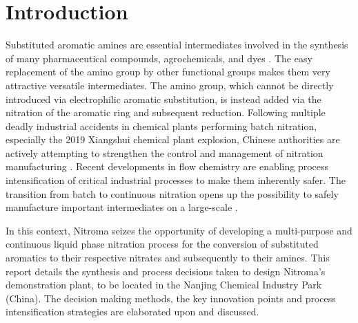 \section{Introduction} %

Substituted aromatic amines are essential intermediates involved in the synthesis of many pharmaceutical compounds, agrochemicals, and dyes \cite{vogt_amines_2000}. The easy replacement of the amino group by other functional groups makes them very attractive versatile intermediates. The amino group, which cannot be directly introduced via electrophilic aromatic substitution, is instead added via the nitration of the aromatic ring and subsequent reduction.
Following multiple deadly industrial accidents in chemical plants performing batch nitration, especially the 2019 Xiangshui chemical plant explosion, Chinese authorities are actively attempting to strengthen the control and management of nitration manufacturing \cite{el_diario_china_2019}.
Recent developments in flow chemistry are enabling process intensification of critical industrial processes to make them inherently safer. The transition from batch to continuous nitration opens up the possibility to safely manufacture important intermediates on a large-scale \cite{di_miceli_raimondi_safety_2015}.

In this context, Nitroma seizes the opportunity of developing a multi-purpose and continuous liquid phase nitration process for the conversion of substituted aromatics to their respective nitrates and subsequently to their amines. 
This report details the synthesis and process decisions taken to design Nitroma’s demonstration plant, to be located in the Nanjing Chemical Industry Park (China). The decision making methods, the key innovation points and process intensification strategies are elaborated upon and discussed.
